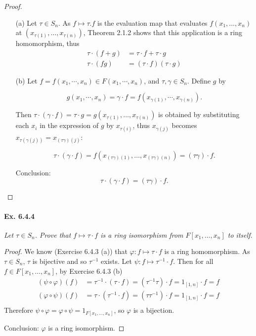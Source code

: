 \documentclass[11pt,a4paper]{article}
\begin{document}
\begin{proof}
\begin{enumerate}
\item[(a)]
Let $\tau \in S_n$. As $f \mapsto \tau.f$ is the evaluation map that evaluates $f(x_1,\ldots,x_n)$ at $(x_{\tau(1)},\ldots,x_{\tau(n)})$, Theorem 2.1.2 shows that this application is a ring homomorphism, thus
\begin{align*}
\tau \cdot (f+g) &= \tau\cdot  f+ \tau\cdot  g\\
\tau \cdot (fg) &= (\tau \cdot  f) (\tau \cdot  g)
\end{align*}

\item[(b)]
Let $f = f(x_1,\cdots,x_n) \in F(x_1,\cdots,x_n)$, and $\tau,\gamma \in S_n$. Define $g$ by

$$g(x_1,\cdots,x_n)  = \gamma \cdot  f = f(x_{\gamma(1)},\cdots,x_{\gamma(n)}).$$

Then $\tau \cdot (\gamma \cdot f) = \tau \cdot g = g(x_{\tau(1)},\ldots,x_{\tau(n)})$ is obtained by substituting each $x_i$ in the expression of $g$ by $x_{\tau(i)}$, thus $x_{\gamma(j)}$ becomes $x_{\tau(\gamma(j))} = x_{(\tau \gamma)(j)}$:

$$\tau\cdot(\gamma \cdot f) = f(x_{(\tau\gamma)(1)},\ldots,x_{(\tau\gamma)(n)}) = (\tau\gamma) \cdot f.$$

Conclusion: $$\tau\cdot (\gamma \cdot f) = (\tau\gamma) \cdot f.$$
\end{enumerate}
\end{proof}

\paragraph{Ex. 6.4.4}

{\it Let $\tau \in S_n$. Prove that $f\mapsto \tau \cdot f$ is a ring isomorphism from $F[x_1,\ldots,x_n]$ to itself.
}

\begin{proof}
We know (Exercise 6.4.3 (a)) that $\varphi : f\mapsto \tau \cdot f$ is a ring homomorphism. As $\tau \in S_n$, $\tau$ is bijective and so $\tau^{-1}$ exists.  Let $\psi : f\mapsto \tau^{-1} \cdot f$. Then for all $f \in F[x_1,\ldots,x_n]$, by Exercise 6.4.3 (b)
\begin{align*}
(\psi \circ \varphi)(f) &= \tau^{-1} \cdot (\tau \cdot f) = (\tau^{-1} \tau)\cdot f = 1_{[1,n]} \cdot f = f\\
(\varphi \circ \psi)(f) &= \tau \cdot (\tau^{-1} \cdot f) = (\tau \tau^{-1})\cdot f = 1_{[1,n]} \cdot f = f\\
\end{align*}
Therefore $\psi \circ \varphi = \varphi \circ \psi = 1_{F[x_1,\ldots,x_n]}$, so $\varphi$ is a bijection.

Conclusion: $\varphi$ is a ring isomorphism.
\end{proof}
\end{document}

